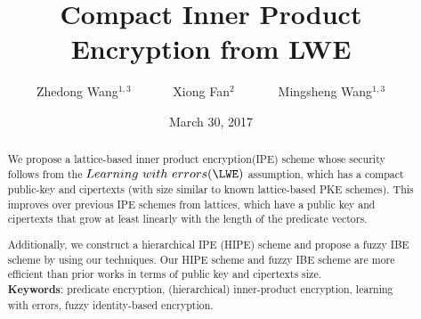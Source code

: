 \documentclass[11pt,hidelinks]{article}
\begin{document}
\title{Compact Inner Product Encryption from LWE}%

\author{Zhedong Wang$^{1,3}$~~~~~~ Xiong Fan$^{2}$~~~~~~~Mingsheng Wang$^{1,3}$}


\date{March 30, 2017}
\maketitle

\begin{abstract}
We propose a lattice-based inner product encryption(IPE) scheme whose security follows from the $Learning~with~errors (\LWE)$ assumption, which has a compact public-key and cipertexts (with size similar to known lattice-based PKE schemes). This improves over previous IPE schemes from lattices, which have a public key and cipertexts that grow at least linearly with the length of the predicate vectors.\

Additionally, we construct a hierarchical IPE (HIPE) scheme and propose a fuzzy IBE scheme by using our techniques. Our HIPE scheme and fuzzy IBE scheme are more efficient than prior works in terms of public key and cipertexts size.\\
\textbf{Keywords}: predicate encryption, (hierarchical) inner-product encryption, learning with errors, fuzzy identity-based encryption.
\end{abstract}
















\end{document}
